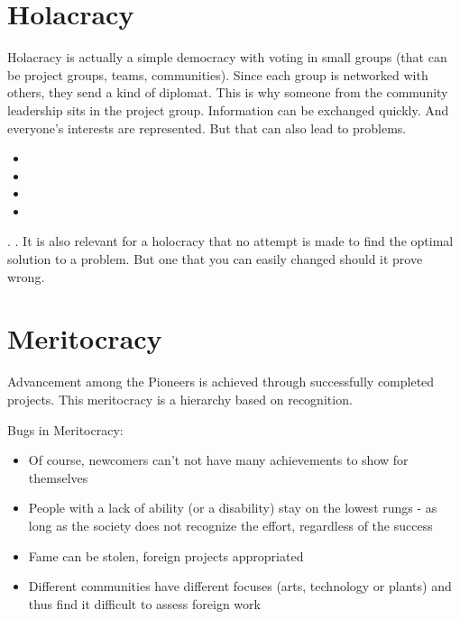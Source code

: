 \section{Holacracy}
Holacracy is actually a simple democracy with voting in small groups (that can be project groups, teams, communities). Since each group is networked with others, they send a kind of diplomat. This is why someone from the community leadership sits in the project group. Information can be exchanged quickly. And everyone's interests are represented. But that can also lead to problems.

\begin{solartalk}[]
    \begin{itemize}
        \item {}
        \item {}
        \item {}
        \item {}
    \end{itemize}
\end{solartalk}

. . It is also relevant for a holocracy that no attempt is made to find the optimal solution to a problem.
But one that you can easily changed should it prove wrong.

\section{Meritocracy}
Advancement among the Pioneers is achieved through successfully completed projects. This meritocracy is a hierarchy based on recognition.

Bugs in Meritocracy:

\begin{itemize}
    \item Of course, newcomers can't not have many achievements to show for themselves
    \item People with a lack of ability (or a disability) stay on the lowest rungs - as long as the society does not recognize the effort, regardless of the success
    \item Fame can be stolen, foreign projects appropriated
    \item Different communities have different focuses (arts, technology or plants) and thus find it difficult to assess foreign work
\end{itemize}

